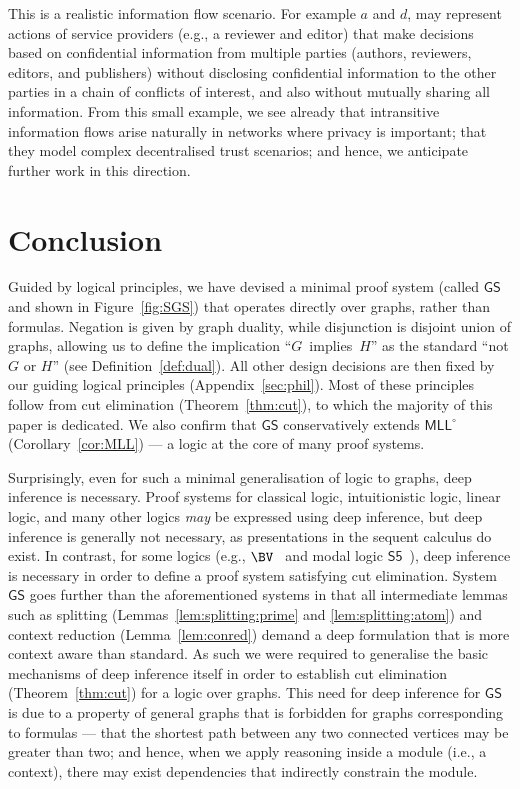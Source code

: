 \documentclass{lmcs} %
\def\GS{\mathsf{GS}}
\def\MLLm{\mathsf{MLL^\circ}}
\def\gG{G}
\def\gH{H}
\theoremstyle{plain}
\begin{document}
This is a realistic information flow scenario. For example $a$ and $d$, may represent actions of service providers (e.g., a reviewer and editor) that make decisions based on confidential information from multiple parties (authors, reviewers, editors, and publishers) without disclosing confidential information to the other parties in a chain of conflicts of interest, and also without mutually sharing all information.
From this small example, we see already that intransitive information flows arise naturally in networks where privacy is important; that they model complex decentralised trust scenarios; and hence, we anticipate further work in this direction.






\def\Sfive{\mathsf{S5}}



\section{Conclusion}\label{sec:conclusion}

Guided by logical principles, we have devised a minimal proof system (called $\GS$ and shown in Figure~\ref{fig:SGS}) 
that operates directly over graphs, rather than formulas.
Negation is given by graph duality, while disjunction is disjoint union of graphs, allowing us to define the implication ``$\gG$~implies~$\gH$'' as the standard ``not $\gG$ or $\gH$'' (see Definition~\ref{def:dual}). All other design decisions are then fixed by our guiding logical principles (Appendix~\ref{sec:phil}).
Most of these principles follow from cut elimination (Theorem~\ref{thm:cut}), to which the majority of this paper is dedicated.
We also confirm that $\GS$ conservatively extends $\MLLm$ (Corollary~\ref{cor:MLL}) --- a logic at the core of many proof systems.

Surprisingly, even for such a minimal generalisation of logic to graphs, deep inference is necessary.
Proof systems for classical logic, intuitionistic logic, linear logic, and many other logics \textit{may} be expressed using deep inference, but deep inference is generally not necessary, as presentations in the sequent calculus do exist.
In contrast, for some logics (e.g., $\BV$~\cite{gug:SIS,tiu:SIS-II} and modal logic $\Sfive$~\cite{Stouppa2007,Poggiolesi2008}),
deep inference is necessary in order to define a proof system satisfying cut elimination.
System $\GS$ goes further than the aforementioned systems in that all intermediate lemmas such as splitting (Lemmas~\ref{lem:splitting:prime} and \ref{lem:splitting:atom}) and context reduction (Lemma~\ref{lem:conred})
demand a deep formulation that is more context aware than standard. As such we were required to generalise the basic mechanisms of deep inference itself in order to establish cut elimination (Theorem~\ref{thm:cut}) for a logic over graphs.
This need for deep inference for $\GS$ is due to a property of general graphs that is forbidden for graphs corresponding to formulas --- that the shortest path between any two connected vertices may be greater than two; and hence, when we apply reasoning inside a module (i.e., a context), there may exist dependencies that indirectly constrain the module. 
\end{document}
